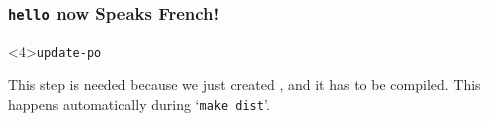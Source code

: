 \documentclass{beamer}
\newcommand{\filename}[1]{{\color{blue}{\textit{\begingroup \urlstyle{sf}\Url{#1}}}}}
\newcommand{\command}[1]{`\texttt{#1}'}
\begin{document}
\begin{frame}[fragile,t]
\frametitle{\texttt{hello} now Speaks French!}

\begin{block}{}
\end{block}

\vspace*{-13em}\hspace*{.51\textwidth}
\begin{minipage}{.46\textwidth}
\begin{block}<4>{\texttt{update-po}}
\begin{center}
This step is needed because we just created \filename{fr.po}, and it
has to be compiled.  This happens automatically during \command{make
  dist}.
\end{center}
\end{block}
\end{minipage}

\end{frame}
\end{document}
